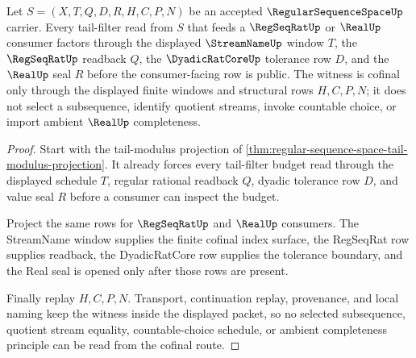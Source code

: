 \begin{theorem}\label{thm:regular-sequence-space-tail-filter-cofinal-witness}
Let $S=(X,T,Q,D,R,H,C,P,N)$ be an accepted $\RegularSequenceSpaceUp$ carrier. Every tail-filter read from $S$ that feeds a $\RegSeqRatUp$ or $\RealUp$ consumer factors through the displayed $\StreamNameUp$ window $T$, the $\RegSeqRatUp$ readback $Q$, the $\DyadicRatCoreUp$ tolerance row $D$, and the $\RealUp$ seal $R$ before the consumer-facing row is public. The witness is cofinal only through the displayed finite windows and structural rows $H,C,P,N$; it does not select a subsequence, identify quotient streams, invoke countable choice, or import ambient $\RealUp$ completeness.
\end{theorem}
\begin{proof}
Start with the tail-modulus projection of \autoref{thm:regular-sequence-space-tail-modulus-projection}. It already forces every tail-filter budget read through the displayed schedule $T$, regular rational readback $Q$, dyadic tolerance row $D$, and value seal $R$ before a consumer can inspect the budget.

Project the same rows for $\RegSeqRatUp$ and $\RealUp$ consumers. The StreamName window supplies the finite cofinal index surface, the RegSeqRat row supplies readback, the DyadicRatCore row supplies the tolerance boundary, and the Real seal is opened only after those rows are present.

Finally replay $H,C,P,N$. Transport, continuation replay, provenance, and local naming keep the witness inside the displayed packet, so no selected subsequence, quotient stream equality, countable-choice schedule, or ambient completeness principle can be read from the cofinal route.
\end{proof}


